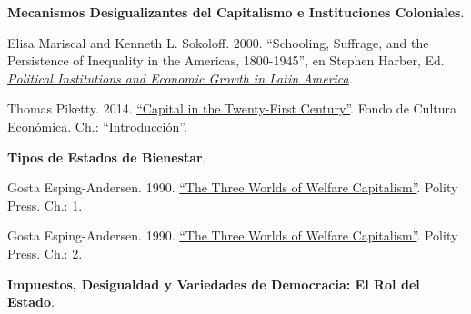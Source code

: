 \documentclass[letterpaper]{article}
\renewenvironment{itemize}{
  \begin{list}{}{
    \setlength{\leftmargin}{1.5em}
  }
}{
  \end{list}
}
\begin{document}
\begin{enumerate}[label=\roman*.]
\begin{itemize}
		\end{itemize}



	\item {}
		\begin{itemize}

			\item[15.] {\bf Mecanismos Desigualizantes del Capitalismo e Instituciones Coloniales}.
				\begin{itemize}
					\item[$\circ$] Elisa Mariscal and Kenneth L. Sokoloff. 2000. ``Schooling, Suffrage, and the Persistence of Inequality in the Americas, 1800-1945'', en Stephen Harber, Ed. \href{https://github.com/hbahamonde/Ciencia_Politica_II/raw/master/Readings/Political_Institutions_Haber.pdf}{\emph{Political Institutions and Economic Growth in Latin America}}.
          
          \item[$\circ$] Thomas Piketty. 2014.  \href{https://github.com/hbahamonde/Ciencia_Politica_II/raw/master/Readings/Piketty_El_capital.pdf}{``Capital in the Twenty-First Century''}. Fondo de Cultura Econ\'omica. Ch.: ``Introducci\'on''.
				\end{itemize}


			\item[16.] {\bf Tipos de Estados de Bienestar}.
				\begin{itemize}
          \item[$\circ$] Gosta Esping-Andersen. 1990. \href{https://github.com/hbahamonde/Ciencia_Politica_II/raw/master/Readings/Esping_Andersen.pdf}{``The Three Worlds of Welfare Capitalism''}. Polity Press. Ch.: 1.
          
          \item[$\circ$] Gosta Esping-Andersen. 1990. \href{https://github.com/hbahamonde/Ciencia_Politica_II/raw/master/Readings/Esping_Andersen.pdf}{``The Three Worlds of Welfare Capitalism''}. Polity Press. Ch.: 2.

        \end{itemize}


			\item[17.] {\bf Impuestos, Desigualdad y Variedades de Democracia: El Rol del Estado}.
				\begin{itemize}
					

\end{itemize}
\end{itemize}
\end{enumerate}
\end{document}
